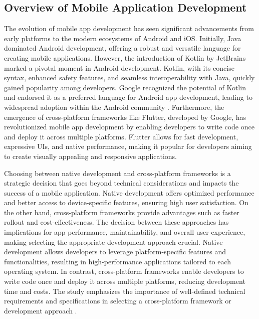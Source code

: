 \subsection{Overview of Mobile Application Development}
The evolution of mobile app development has seen significant advancements from early platforms to the modern ecosystems of Android and iOS. Initially, Java dominated Android development, offering a robust and versatile language for creating mobile applications. However, the introduction of Kotlin by JetBrains marked a pivotal moment in Android development. Kotlin, with its concise syntax, enhanced safety features, and seamless interoperability with Java, quickly gained popularity among developers. Google recognized the potential of Kotlin and endorsed it as a preferred language for Android app development, leading to widespread adoption within the Android community \cite{zhang2023entertainment}. Furthermore, the emergence of cross-platform frameworks like Flutter, developed by Google, has revolutionized mobile app development by enabling developers to write code once and deploy it across multiple platforms. Flutter allows for fast development, expressive UIs, and native performance, making it popular for developers aiming to create visually appealing and responsive applications.
\par
Choosing between native development and cross-platform frameworks is a strategic decision that goes beyond technical considerations and impacts the success of a mobile application. Native development offers optimized performance and better access to device-specific features, ensuring high user satisfaction. On the other hand, cross-platform frameworks provide advantages such as faster rollout and cost-effectiveness. The decision between these approaches has implications for app performance, maintainability, and overall user experience, making selecting the appropriate development approach crucial. Native development allows developers to leverage platform-specific features and functionalities, resulting in high-performance applications tailored to each operating system. In contrast, cross-platform frameworks enable developers to write code once and deploy it across multiple platforms, reducing development time and costs. The study emphasizes the importance of well-defined technical requirements and specifications in selecting a cross-platform framework or development approach \cite{biorn2020empirical}.
\par
